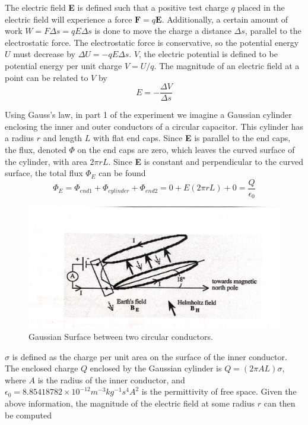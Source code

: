 \documentclass[letterpaper]{article}
\begin{document}
The electric field \textbf{E} is defined such that a positive test charge $q$
placed in the electric field will experience a force $\textbf{F}=q\textbf{E}$.
Additionally, a certain amount of work $W=F \Delta s=qE\Delta s$ is done to move the charge
a distance $\Delta s$, parallel to the electrostatic force. The electrostatic force is
conservative, so the potential energy $U$ must decrease by $\Delta U=-qE\Delta s$.
$V$, the electric potential is defined to be potential energy per unit charge $V=U/q$.
The magnitude of an electric field at a point can be related to $V$ by
\begin{equation}
  E=-\frac{\Delta V}{\Delta s} \label{eq1}
\end{equation}

Using Gauss's law, in part 1 of the experiment we imagine a Gaussian cylinder enclosing
the inner and outer conductors of a circular capacitor. This cylinder has a radius $r$ and
length $L$ with flat end caps. Since \textbf{E} is parallel to the end caps, the flux, denoted $\Phi$ on
the end caps are zero, which leaves the curved surface of the cylinder, with area $2\pi rL$.
Since \textbf{E} is constant and perpendicular to the curved surface, the total flux $\Phi_E$ can be found
\begin{equation}
  \Phi_E = \Phi_{end1} + \Phi_{cylinder} + \Phi_{end2} = 0+E(2\pi rL) + 0 =\frac{Q}{\epsilon_0}
\end{equation}
\begin{figure}[H]
    \centering
    \includegraphics[width=\textwidth]{fig1.jpg}
    \caption{Gaussian Surface between two circular conductors. \cite{labmanual}}
\end{figure}

$\sigma$ is defined as the charge per unit area on the surface of the inner conductor.
The enclosed charge $Q$ enclosed by the Gaussian cylinder is $Q=(2 \pi AL)\sigma$, where
$A$ is the radius of the inner conductor, and $\epsilon_0=8.85418782 \times 10^{-12} m^{-3} kg^{-1} s^{4} A^{2}$ is the permittivity of free space.
Given the above information, the magnitude of the electric field at some radius $r$
can then be computed
\end{document}
